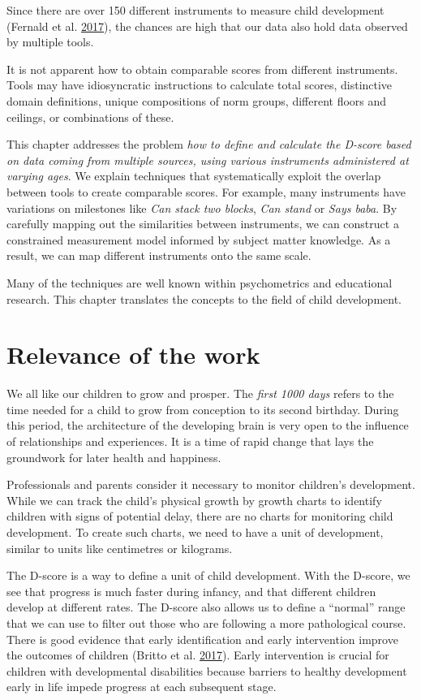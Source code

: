 \documentclass[
]{book}
\begin{document}
Since there are over 150 different instruments to measure child development (Fernald et al. \protect\hyperlink{ref-fernald2017toolkit}{2017}), the chances are high that our data also hold data observed by multiple tools.

It is not apparent how to obtain comparable scores from different instruments. Tools may have idiosyncratic instructions to calculate total scores, distinctive domain definitions, unique compositions of norm groups, different floors and ceilings, or combinations of these.

This chapter addresses the problem \emph{how to define and calculate the D-score based on data coming from multiple sources, using various instruments administered at varying ages}. We explain techniques that systematically exploit the overlap between tools to create comparable scores. For example, many instruments have variations on milestones like \emph{Can stack two blocks}, \emph{Can stand} or \emph{Says baba}. By carefully mapping out the similarities between instruments, we can construct a constrained measurement model informed by subject matter knowledge. As a result, we can map different instruments onto the same scale.

Many of the techniques are well known within psychometrics and educational research. This chapter translates the concepts to the field of child development.

\hypertarget{sec:relevance}{%
\section{Relevance of the work}\label{sec:relevance}}

We all like our children to grow and prosper. The \emph{first 1000 days} refers to the time needed for a child to grow from conception to its second birthday. During this period, the architecture of the developing brain is very open to the influence of relationships and experiences. It is a time of rapid change that lays the groundwork for later health and happiness.

Professionals and parents consider it necessary to monitor children's development. While we can track the child's physical growth by growth charts to identify children with signs of potential delay, there are no charts for monitoring child development. To create such charts, we need to have a unit of development, similar to units like centimetres or kilograms.

The D-score is a way to define a unit of child development. With the D-score, we see that progress is much faster during infancy, and that different children develop at different rates. The D-score also allows us to define a ``normal'' range that we can use to filter out those who are following a more pathological course. There is good evidence that early identification and early intervention improve the outcomes of children (Britto et al. \protect\hyperlink{ref-britto2017}{2017}). Early intervention is crucial for children with developmental disabilities because barriers to healthy development early in life impede progress at each subsequent stage.
\end{document}
